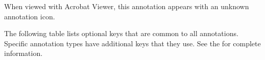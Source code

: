 \documentclass[letterpaper,12pt,english,openany,oneside]{sphinxmanual}
\begin{document}
\begin{sphinxVerbatim}[commandchars=\\\{\}]
\PYG{p}{[} \PYG{p}{[}     \PYG{p}{]}
    
    \PYG{p}{[}         \PYG{p}{]}
    
\end{sphinxVerbatim}

When viewed with Acrobat Viewer, this annotation appears with an unknown annotation icon.

The following table lists optional keys that are common to all annotations. Specific annotation types have additional keys that they use. See the  for complete information.

\end{document}
